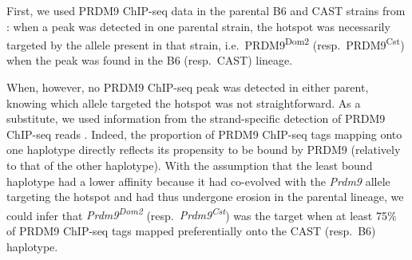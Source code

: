 First, we used PRDM9 ChIP-seq data in the parental B6 and CAST strains from \citet{baker2015prdm9}: 
when a peak was detected in one parental strain, the hotspot was necessarily targeted by the allele present in that strain, i.e.\ PRDM9\textsuperscript{Dom2} (resp.\ PRDM9\textsuperscript{Cst}) when the peak was found in the B6 (resp.\ CAST) lineage.

%

When, however, no PRDM9 ChIP-seq peak was detected in either parent, knowing which allele targeted the hotspot was not straightforward.
As a substitute, we used information from the strand-specific detection of PRDM9 ChIP-seq reads \citep{baker2015prdm9}.
Indeed, the proportion of PRDM9 ChIP-seq tags mapping onto one haplotype directly reflects its propensity to be bound by PRDM9 (relatively to that of the other haplotype).
With the assumption that the least bound haplotype had a lower affinity because it had co-evolved with the \textit{Prdm9} allele targeting the hotspot and had thus undergone erosion in the parental lineage, we could infer that \textit{Prdm9\textsuperscript{Dom2}} (resp.\ \textit{Prdm9\textsuperscript{Cst}}) was the target when at least 75\% of PRDM9 ChIP-seq tags mapped preferentially onto the CAST (resp.\ B6) haplotype.



